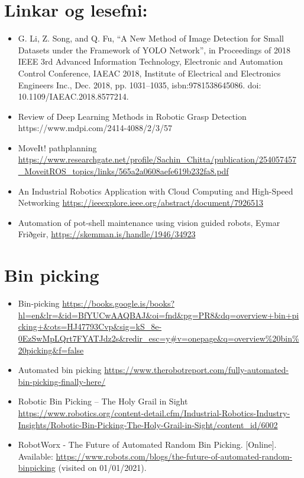 \section{Linkar og lesefni:}
\begin{itemize}
    \item G. Li, Z. Song, and Q. Fu, “A New Method of Image Detection for Small Datasets under
the Framework of YOLO Network”, in Proceedings of 2018 IEEE 3rd Advanced Information Technology, Electronic and Automation Control Conference, IAEAC 2018,
Institute of Electrical and Electronics Engineers Inc., Dec. 2018, pp. 1031–1035, isbn:9781538645086. doi: 10.1109/IAEAC.2018.8577214.
    \item Review of Deep Learning Methods in Robotic Grasp Detection  https://www.mdpi.com/2414-4088/2/3/57
    \item MoveIt! pathplanning  \url{https://www.researchgate.net/profile/Sachin_Chitta/publication/254057457_MoveitROS_topics/links/565a2a0608aefe619b232fa8.pdf}
    \item An Industrial Robotics Application with Cloud Computing and High-Speed Networking \url{https://ieeexplore.ieee.org/abstract/document/7926513}
    \item Automation of pot-shell maintenance using vision guided robots, Eymar Friðgeir, \url{https://skemman.is/handle/1946/34923}
\end{itemize}

\section{Bin picking}
\begin{itemize}
    \item Bin-picking \url{https://books.google.is/books?hl=en&lr=&id=BfYUCwAAQBAJ&oi=fnd&pg=PR8&dq=overview+bin+picking+&ots=HJ47793Cvp&sig=kS_8e-0EzSwMpLQrt7FYATJdz2s&redir_esc=y#v=onepage&q=overview%20bin%20picking&f=false}
    \item Automated bin picking \url{https://www.therobotreport.com/fully-automated-bin-picking-finally-here/}
    \item Robotic Bin Picking – The Holy Grail in Sight \url{https://www.robotics.org/content-detail.cfm/Industrial-Robotics-Industry-Insights/Robotic-Bin-Picking-The-Holy-Grail-in-Sight/content_id/6002}
    \item RobotWorx - The Future of Automated Random Bin Picking. [Online]. Available: \url{https://www.robots.com/blogs/the-future-of-automated-random-binpicking} (visited on 01/01/2021).
\end{itemize}

